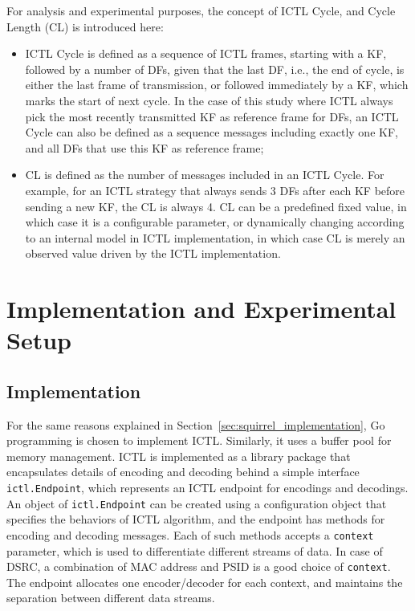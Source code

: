 \documentclass[12pt]{report}
\begin{document}
For analysis and experimental purposes, the concept of ICTL Cycle, and Cycle Length (CL) is introduced here:
\begin{itemize}
  \item ICTL Cycle is defined as a sequence of ICTL frames, starting with a KF, followed by a number of DFs, given that the last DF, i.e., the end of cycle, is either the last frame of transmission, or followed immediately by a KF, which marks the start of next cycle. In the case of this study where ICTL always pick the most recently transmitted KF as reference frame for DFs, an ICTL Cycle can also be defined as a sequence messages including exactly one KF, and all DFs that use this KF as reference frame;
  \item CL is defined as the number of messages included in an ICTL Cycle. For example, for an ICTL strategy that always sends 3 DFs after each KF before sending a new KF, the CL is always 4. CL can be a predefined fixed value, in which case it is a configurable parameter, or dynamically changing according to an internal model in ICTL implementation, in which case CL is merely an observed value driven by the ICTL implementation.
\end{itemize}

\section{Implementation and Experimental Setup}

\subsection{Implementation}

For the same reasons explained in Section~\ref{sec:squirrel_implementation}, Go programming is chosen to implement ICTL. Similarly, it uses a buffer pool for memory management. ICTL is implemented as a library package that encapsulates details of encoding and decoding behind a simple interface \texttt{ictl.Endpoint}, which represents an ICTL endpoint for encodings and decodings. An object of \texttt{ictl.Endpoint} can be created using a configuration object that specifies the behaviors of ICTL algorithm, and the endpoint has methods for encoding and decoding messages. Each of such methods accepts a \texttt{context} parameter, which is used to differentiate different streams of data. In case of DSRC, a combination of MAC address and PSID is a good choice of \texttt{context}. The endpoint allocates one encoder/decoder for each context, and maintains the separation between different data streams.
\end{document}
